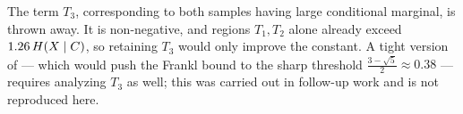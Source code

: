\begin{remark}
\label{rem:discarded}
The term $T_3$, corresponding to both samples having large conditional marginal,
is thrown away. It is non-negative, and regions $T_1, T_2$ alone already exceed
$1.26\,H(X \mid C)$, so retaining $T_3$ would only improve the constant. A
tight version of  — which would push the Frankl bound to
the sharp threshold $\tfrac{3 - \sqrt{5}}{2} \approx 0.38$ — requires analyzing
$T_3$ as well; this was carried out in follow-up work and is not reproduced here.
\end{remark}
